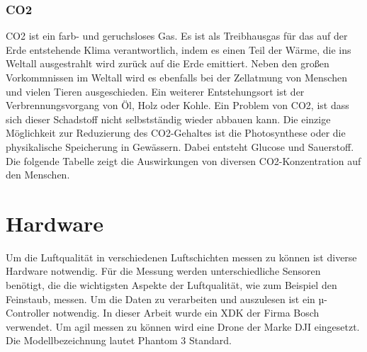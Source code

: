 \subsubsection{\acl{CO2}}
\acs{CO2} ist ein farb- und geruchsloses Gas. Es ist als Treibhausgas für das auf der Erde entstehende Klima verantwortlich, indem es einen Teil der Wärme, die ins Weltall ausgestrahlt wird zurück auf die Erde emittiert. Neben den großen Vorkommnissen im Weltall wird es ebenfalls bei der Zellatmung von Menschen und vielen Tieren ausgeschieden. Ein weiterer Entstehungsort ist der Verbrennungsvorgang von Öl, Holz oder Kohle. Ein Problem von \acs{CO2}, ist dass sich dieser Schadstoff nicht selbstständig wieder abbauen kann. Die einzige Möglichkeit zur Reduzierung des \acs{CO2}-Gehaltes ist die Photosynthese oder die physikalische Speicherung in Gewässern. Dabei entsteht Glucose und Sauerstoff. 
\newline
Die folgende Tabelle zeigt die Auswirkungen von diversen \acs{CO2}-Konzentration auf den Menschen.


\section{Hardware}\label{sec:Hardware}
Um die Luftqualität in verschiedenen Luftschichten messen zu können ist diverse Hardware notwendig. 
\newline
Für die Messung werden unterschiedliche Sensoren benötigt, die die wichtigsten Aspekte der Luftqualität, wie zum Beispiel den Feinstaub, messen. 
\newline
Um die Daten zu verarbeiten und auszulesen ist ein µ-Controller notwendig. In dieser Arbeit wurde ein XDK der Firma Bosch verwendet. 
\newline
Um agil messen zu können wird eine Drone der Marke DJI eingesetzt. Die Modellbezeichnung lautet Phantom 3 Standard.

